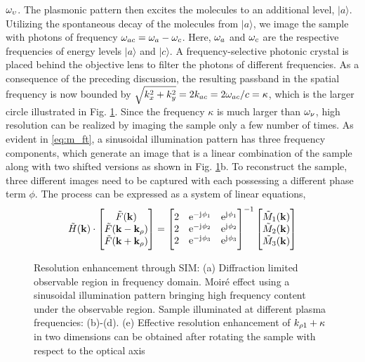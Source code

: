 $\omega_{\upsilon}$. The plasmonic pattern then excites the molecules to an
additional level, $|a\rangle$. Utilizing the spontaneous decay of the molecules from $|a\rangle$, we image the sample with photons of frequency $\omega_{ac} = \omega_{a}-\omega_{c}$. Here, $\omega_{a}$ and $\omega_{c}$ are the respective frequencies of energy levels $|a\rangle$ and $|c\rangle$. A frequency-selective photonic crystal is placed behind the objective lens to filter the photons of different frequencies. As a consequence of the preceding discussion, the resulting passband in the spatial frequency is now bounded by $\sqrt{k_x^2 + k_y^2} = 2 k_{ac} = 2 \omega_{ac}/c = \kappa$, which is the larger circle illustrated in Fig. \ref{fig:sim}. Since the frequency $\kappa$ is much larger than $\omega_{\nu}$, high resolution can be realized by imaging the sample only a few number of times.
%
As evident in \eqref{eq:m_ft}, a sinusoidal illumination pattern has three frequency components, which generate an image that is a linear combination of the sample along with two shifted versions as shown in Fig. \ref{fig:sim}b. To reconstruct the sample, three different images need to be captured with each possessing a different phase term $\phi$. The process can be expressed as a system of linear equations,
%
\begin{equation}
  \tilde{H}(\mathbf{k}) \cdot
  \begin{bmatrix}
    \tilde{F}(\mathbf{k}) \\
    \tilde{F}(\mathbf{k} - \mathbf{k}_{\rho}) \\
    \tilde{F}(\mathbf{k} + \mathbf{k}_{\rho})
  \end{bmatrix}
  =
  \begin{bmatrix}
    2 & \mathrm{e}^{-\mathrm{j}\mkern1mu \phi_1} & \mathrm{e}^{\mathrm{j}\mkern1mu \phi_1} \\
    2 & \mathrm{e}^{-\mathrm{j}\mkern1mu \phi_2} & \mathrm{e}^{\mathrm{j}\mkern1mu \phi_2} \\
    2 & \mathrm{e}^{-\mathrm{j}\mkern1mu \phi_3} & \mathrm{e}^{\mathrm{j}\mkern1mu \phi_3} \\
  \end{bmatrix}^{-1}
  \begin{bmatrix}
   \tilde{M}_1(\mathbf{k}) \\
   \tilde{M}_2(\mathbf{k}) \\
   \tilde{M}_3(\mathbf{k})
  \end{bmatrix}
  \label{eq:reconstruction_algo}
\end{equation}
%
\begin{figure}[t!]
  \centering
  \def\svgwidth{.75\linewidth}
  
  \caption{Resolution enhancement through SIM: (a) Diffraction limited observable region in frequency domain.  Moiré effect using a sinusoidal illumination pattern bringing high frequency content under the observable region. Sample illuminated at different plasma frequencies: (b)-(d). (e) Effective resolution enhancement of $k_{\rho 1} + \kappa$ in two dimensions can be obtained after rotating the sample with respect to the optical axis}
  \label{fig:sim}
\end{figure}
